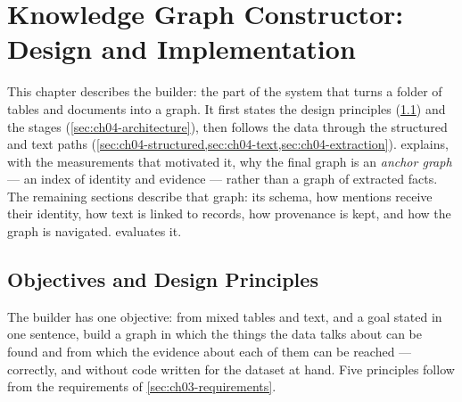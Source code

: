 \chapter{Knowledge Graph Constructor: Design and Implementation}\label{ch04}

This chapter describes the builder: the part of the system that turns a folder of tables and documents into a
graph. It first states the design principles (\cref{sec:ch04-principles}) and the stages
(\cref{sec:ch04-architecture}), then follows the data through the structured and text paths
(\cref{sec:ch04-structured,sec:ch04-text,sec:ch04-extraction}).  explains, with the
measurements that motivated it, why the final graph is an \emph{anchor graph} --- an index of identity and
evidence --- rather than a graph of extracted facts. The remaining sections describe that graph: its schema,
how mentions receive their identity, how text is linked to records, how provenance is kept, and how the graph
is navigated.  evaluates it.

\section{Objectives and Design Principles}\label{sec:ch04-principles}

The builder has one objective: from mixed tables and text, and a goal stated in one sentence, build a graph in
which the things the data talks about can be found and from which the evidence about each of them can be
reached --- correctly, and without code written for the dataset at hand. Five principles follow from the
requirements of \cref{sec:ch03-requirements}.

